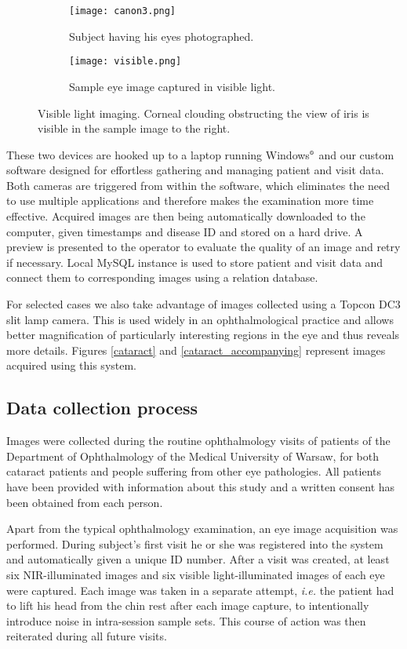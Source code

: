 \documentclass[a4paper]{spie}
\begin{document}
\begin{figure}
\centering
\begin{subfigure}{0.5\textwidth}
  \centering
  \texttt{[image: canon3.png]}
  \caption{Subject having his eyes photographed.}
  \label{visible:subject}
\end{subfigure}%
\begin{subfigure}{0.5\textwidth}
  \centering
  \texttt{[image: visible.png]}
  \caption{Sample eye image captured in visible light.}
  \label{visible:eye}
\end{subfigure}
\vskip0.2cm
\caption{Visible light imaging. Corneal clouding obstructing the view of iris is visible in the sample image to the right.}
\label{visible}
\end{figure}

These two devices are hooked up to a laptop running Windows$^\textrm{\tiny\textregistered}$ and our custom software designed for effortless gathering and managing patient and visit data. Both cameras are triggered from within the software, which eliminates the need to use multiple applications and therefore makes the examination more time effective. Acquired images are then being automatically downloaded to the computer, given timestamps and disease ID and stored on a hard drive. A preview is presented to the operator to evaluate the quality of an image and retry if necessary. Local MySQL instance is used to store patient and visit data and connect them to corresponding images using a relation database.

For selected cases we also take advantage of images collected using a Topcon DC3 slit lamp camera. This is used widely in an ophthalmological practice and allows better magnification of particularly interesting regions in the eye and thus reveals more details. Figures \ref{cataract} and \ref{cataract_accompanying} represent images acquired using this system.

\subsection{Data collection process}
Images were collected during the routine ophthalmology visits of patients of the Department of Ophthalmology of the Medical University of Warsaw, for both cataract patients and people suffering from other eye pathologies. All patients have been provided with information about this study and a written consent has been obtained from each person.

Apart from the typical ophthalmology examination, an eye image acquisition was performed. During subject's first visit he or she was registered into the system and automatically given a unique ID number. After a visit was created, at least six NIR-illuminated images and six visible light-illuminated images of each eye were captured. Each image was taken in a separate attempt, \emph{i.e.} the patient had to lift his head from the chin rest after each image capture, to intentionally introduce noise in intra-session sample sets. This course of action was then reiterated during all future visits.
\end{document}
